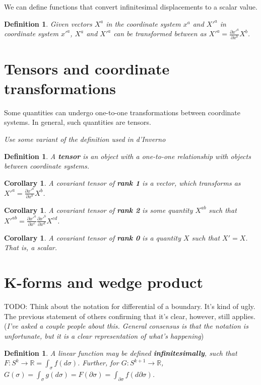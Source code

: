 \documentclass{book}
\newtheorem{defn}[equation]{Definition}
\newtheorem{coro}[equation]{Corollary}
\begin{document}
We can define functions that convert infinitesimal displacements to a scalar value. 

\begin{defn}
	Given vectors $X^a$ in the coordinate system $x^a$ and $X'^a$ in coordinate system $x'^a$, $X^a$ and $X'^a$ can be transformed between as $X'^a = \frac{\partial x'^a}{\partial x^b} X^b$. 
\end{defn}

\section{Tensors and coordinate transformations}
Some quantities can undergo one-to-one transformations between coordinate systems. In general, such quantities are tensors. 

\emph{Use some variant of the definition used in d'Inverno}
\begin{defn}
	A \textbf{tensor} is an object with a one-to-one relationship with objects between coordinate systems. 
\end{defn}

\begin{coro}
	A covariant tensor of \textbf{rank 1} is a vector, which transforms as  $X'^a = \frac{\partial x'^a}{\partial x^b} X^b$.  
\end{coro}

\begin{coro}
	A covariant tensor of \textbf{rank 2} is some quantity $X^{ab}$ such that $X'^{ab} = \frac{\partial x'^a}{\partial x^c} \frac{\partial x'^b}{\partial x^d} X^{cd}$. 
\end{coro}

\begin{coro}
	A covariant tensor of \textbf{rank 0} is a quantity $X$ such that $X' = X$. That is, a scalar. 
\end{coro}

\section{K-forms and wedge product}

TODO: Think about the notation for differential of a boundary. It's kind of ugly. The previous statement of others confirming that it's clear, however, still applies.  (\emph{I've asked a couple people about this. General consensus is that the notation is unfortunate, but it is a clear representation of what's happening})

\begin{defn}
	A linear function may be defined \textbf{infinitesimally}, such that $F : S^k \to \mathbb{R} = \int_{\sigma} f(d\sigma)$. Further, for $G : S^{k+1} \to \mathbb{R}$, $G(\sigma) = \int_{\sigma} g(d\sigma) = F(\partial\sigma) = \int_{\partial\sigma}f(d\partial\sigma)$. 
\end{defn}
\end{document}

